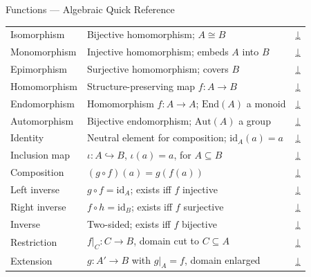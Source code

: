 \begin{toolkitbox}{Functions — Algebraic Quick Reference}
\begin{tabular}{l l l}
Isomorphism       & Bijective homomorphism; $A \cong B$                   & \hyperref[def:isomorphism]{↓} \\
Monomorphism      & Injective homomorphism; embeds $A$ into $B$           & \hyperref[def:monomorphism]{↓} \\
Epimorphism       & Surjective homomorphism; covers $B$                   & \hyperref[def:epimorphism]{↓} \\
Homomorphism      & Structure-preserving map $f : A \to B$                & \hyperref[def:homomorphism]{↓} \\
Endomorphism      & Homomorphism $f : A \to A$; $\mathrm{End}(A)$ a monoid & \hyperref[def:endomorphism]{↓} \\
Automorphism      & Bijective endomorphism; $\mathrm{Aut}(A)$ a group     & \hyperref[def:automorphism]{↓} \\
Identity          & Neutral element for composition; $\mathrm{id}_A(a)=a$ & \hyperref[def:alg-identity]{↓} \\
Inclusion map     & $\iota : A \hookrightarrow B$, $\iota(a)=a$, for $A \subseteq B$ & \hyperref[def:alg-inclusion]{↓} \\
Composition       & $(g \circ f)(a) = g(f(a))$                           & \hyperref[def:alg-composition]{↓} \\
Left inverse      & $g \circ f = \mathrm{id}_A$; exists iff $f$ injective  & \hyperref[def:alg-left-inverse]{↓} \\
Right inverse     & $f \circ h = \mathrm{id}_B$; exists iff $f$ surjective & \hyperref[def:alg-left-inverse]{↓} \\
Inverse           & Two-sided; exists iff $f$ bijective                  & \hyperref[def:alg-inverse]{↓} \\
Restriction       & $f|_C : C \to B$, domain cut to $C \subseteq A$      & \hyperref[def:alg-restriction]{↓} \\
Extension         & $g : A' \to B$ with $g|_A = f$, domain enlarged      & \hyperref[def:alg-restriction]{↓} \\
\bottomrule
\end{tabular}
\end{toolkitbox}




